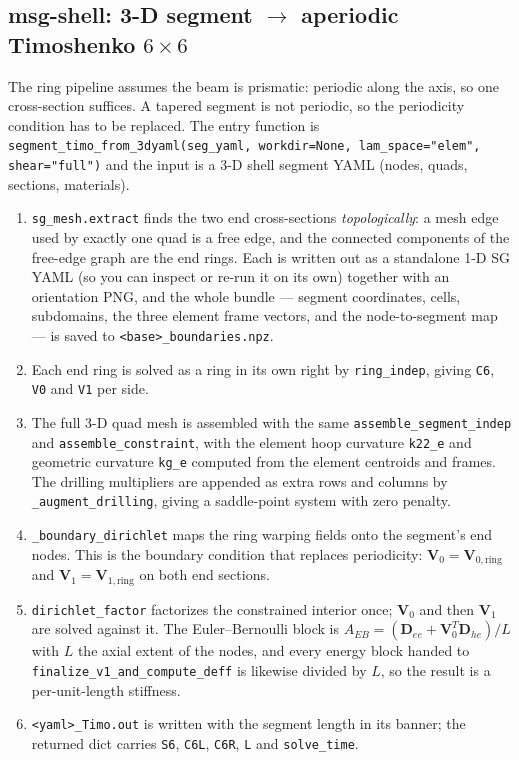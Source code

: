 \subsection{msg-shell: 3-D segment $\rightarrow$ aperiodic Timoshenko $6\times6$}
\label{sec:pipe-segment}

The ring pipeline assumes the beam is prismatic: periodic along the axis, so one
cross-section suffices. A tapered segment is not periodic, so the periodicity
condition has to be replaced. The entry function is
\texttt{segment\_timo\_from\_3dyaml(seg\_yaml, workdir=None,
lam\_space="elem", shear="full")} and the input is a 3-D shell segment YAML
(nodes, quads, sections, materials).

\begin{enumerate}
\item \texttt{sg\_mesh.extract} finds the two end cross-sections
      \emph{topologically}: a mesh edge used by exactly one quad is a free edge,
      and the connected components of the free-edge graph are the end rings.
      Each is written out as a standalone 1-D SG YAML (so you can inspect or
      re-run it on its own) together with an orientation PNG, and the whole
      bundle --- segment coordinates, cells, subdomains, the three element frame
      vectors, and the node-to-segment map --- is saved to
      \texttt{<base>\_boundaries.npz}.
\item Each end ring is solved as a ring in its own right by
      \texttt{ring\_indep}, giving \texttt{C6}, \texttt{V0} and \texttt{V1} per
      side.
\item The full 3-D quad mesh is assembled with the same
      \texttt{assemble\_segment\_indep} and \texttt{assemble\_constraint}, with
      the element hoop curvature \texttt{k22\_e} and geometric curvature
      \texttt{kg\_e} computed from the element centroids and frames. The
      drilling multipliers are appended as extra rows and columns by
      \texttt{\_augment\_drilling}, giving a saddle-point system with zero
      penalty.
\item \texttt{\_boundary\_dirichlet} maps the ring warping fields onto the
      segment's end nodes. This is the boundary condition that replaces
      periodicity: $\mathbf{V}_0 = \mathbf{V}_{0,\mathrm{ring}}$ and
      $\mathbf{V}_1 = \mathbf{V}_{1,\mathrm{ring}}$ on both end sections.
\item \texttt{dirichlet\_factor} factorizes the constrained interior once;
      $\mathbf{V}_0$ and then $\mathbf{V}_1$ are solved against it. The
      Euler--Bernoulli block is
      $A_{EB} = (\mathbf{D}_{ee} + \mathbf{V}_0^{T}\mathbf{D}_{he})/L$ with $L$
      the axial extent of the nodes, and every energy block handed to
      \texttt{finalize\_v1\_and\_compute\_deff} is likewise divided by $L$, so
      the result is a per-unit-length stiffness.
\item \texttt{<yaml>\_Timo.out} is written with the segment length in its
      banner; the returned dict carries \texttt{S6}, \texttt{C6L}, \texttt{C6R},
      \texttt{L} and \texttt{solve\_time}.
\end{enumerate}

